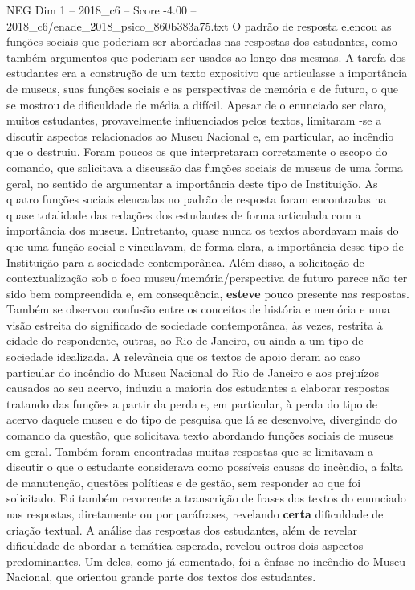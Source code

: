 \begin{textsample}{NEG Dim 1 – 2018\_c6 – Score -4.00 – 2018\_c6/enade\_2018\_psico\_860b383a75.txt}
O padrão de resposta elencou as funções sociais que poderiam ser abordadas nas respostas dos estudantes, como também argumentos que poderiam ser usados ao longo das mesmas.
A tarefa dos estudantes era a construção de um texto expositivo que articulasse a importância de museus, suas funções sociais e as perspectivas de memória e de futuro, o que se mostrou de dificuldade de média a difícil.
Apesar de o enunciado ser claro, muitos estudantes, provavelmente influenciados pelos textos, limitaram -se a discutir aspectos relacionados ao Museu Nacional e, em particular, ao incêndio que o destruiu.
Foram poucos os que interpretaram corretamente o escopo do comando, que solicitava a discussão das funções sociais de museus de uma forma geral, no sentido de argumentar a importância deste tipo de Instituição.
As quatro funções sociais elencadas no padrão de resposta foram encontradas na quase totalidade das redações dos estudantes de forma articulada com a importância dos museus.
Entretanto, quase nunca os textos abordavam mais do que uma função social e vinculavam, de forma clara, a importância desse tipo de Instituição para a sociedade contemporânea.
Além disso, a solicitação de contextualização sob o foco museu/memória/perspectiva de futuro parece não ter sido bem compreendida e, em consequência, \textbf{esteve} pouco presente nas respostas.
Também se observou confusão entre os conceitos de história e memória e uma visão estreita do significado de sociedade contemporânea, às vezes, restrita à cidade do respondente, outras, ao Rio de Janeiro, ou ainda a um tipo de sociedade idealizada.
A relevância que os textos de apoio deram ao caso particular do incêndio do Museu Nacional do Rio de Janeiro e aos prejuízos causados ao seu acervo, induziu a maioria dos estudantes a elaborar respostas tratando das funções a partir da perda e, em particular, à perda do tipo de acervo daquele museu e do tipo de pesquisa que lá se desenvolve, divergindo do comando da questão, que solicitava texto abordando funções sociais de museus em geral.
Também foram encontradas muitas respostas que se limitavam a discutir o que o estudante considerava como possíveis causas do incêndio, a falta de manutenção, questões políticas e de gestão, sem responder ao que foi solicitado.
Foi também recorrente a transcrição de frases dos textos do enunciado nas respostas, diretamente ou por paráfrases, revelando \textbf{certa} dificuldade de criação textual.
A análise das respostas dos estudantes, além de revelar dificuldade de abordar a temática esperada, revelou outros dois aspectos predominantes.
Um deles, como já comentado, foi a ênfase no incêndio do Museu Nacional, que orientou grande parte dos textos dos estudantes.

\end{textsample}
